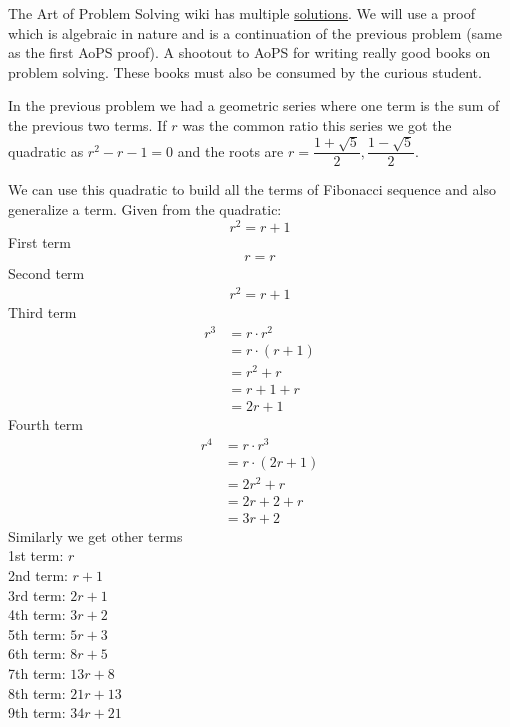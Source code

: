 \documentclass[10pt,letterpaper]{article}
\begin{document}
  The Art of Problem Solving wiki has multiple 
  \href{https://artofproblemsolving.com/wiki/index.php/Binet%27s_Formula?srsltid=AfmBOopZoFLXIajI-JoM3fYvZ8skdUXvlgDV4u0u3smoftRnyHuo1zZK}{solutions}.
  We will use a proof which is algebraic in nature and is a continuation of the previous problem (same as the first AoPS proof). A shootout to AoPS for writing
  really good books on problem solving. These books must also be consumed by the curious student.

  In the previous problem we had a geometric series where one term is the sum of the previous two terms. If $r$ was the common ratio
  this series we got the quadratic as $r^2 - r - 1 = 0$ and the roots are $r = \dfrac{1 + \sqrt{5}}{2}, \dfrac{1 - \sqrt{5}}{2}$.

  We can use this quadratic to build all the terms of Fibonacci sequence and also generalize a term.
  Given from the quadratic:
  \[
  r^2 = r + 1
  \]
  First term
  \begin{gather*}
    r = r
  \end{gather*}
  Second term
  \begin{gather*}
    r^2 = r + 1
  \end{gather*}
  Third term
  \begin{align*}
    r^3 &= r \cdot r^2\\
    &= r \cdot (r + 1)\\
    &= r^2 + r\\
    &= r + 1 + r\\ 
    &= 2r + 1
  \end{align*}
  Fourth term
  \begin{align*}
    r^4 &= r \cdot r^3\\
    &= r \cdot (2r + 1)\\
    &= 2r^2 + r\\
    &= 2r + 2 + r\\ 
    &= 3r + 2
  \end{align*}
  Similarly we get other terms\\
  1st term: $r$\\
  2nd term: $r + 1$\\
  3rd term: $2r + 1$\\
  4th term: $3r + 2$\\
  5th term: $5r + 3$\\
  6th term: $8r + 5$\\
  7th term: $13r + 8$\\
  8th term: $21r + 13$\\
  9th term: $34r + 21$\\
\end{document}
